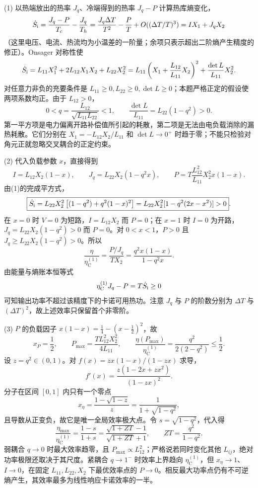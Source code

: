 (1) 以热端放出的热率 \(J_q\)、冷端得到的热率 \(J_q-P\) 计算热库熵变化，
\[
\dot S_{\rm i}=\frac{J_q-P}{T_c}-\frac{J_q}{T_h}
=\frac{J_q\Delta T}{T^2}-\frac{P}{T}+O((\Delta T/T)^3)
=I X_1+J_qX_2
\]
（这里电压、电流、热流均为小温差的一阶量；余项只表示超出二阶熵产生精度的修正）。Onsager 对称性使
\[
\dot S_{\rm i}=L_{11}X_1^2+2L_{12}X_1X_2+L_{22}X_2^2
=L_{11}\left(X_1+\frac{L_{12}}{L_{11}}X_2\right)^2+
\frac{\det L}{L_{11}}X_2^2 .
\]
对任意力非负的充要条件是 \(L_{11}\ge0,L_{22}\ge0,\det L\ge0\)；本题严格正定的假设使两项系数均正。由于 \(L_{12}>0\)，
\[
\boxed{0<q=\frac{L_{12}}{\sqrt{L_{11}L_{22}}}<1},\qquad
\frac{\det L}{L_{11}}=L_{22}(1-q^2)>0.
\]
第一平方项是电力偏离开路补偿值所引起的耗散，第二项是无法由电负载消除的漏热耗散。它们分别在 \(X_1=-L_{12}X_2/L_{11}\) 和 \(\det L\to0^+\) 时趋于零；不能只检验对角元正就忽略交叉耦合的正定约束。

(2) 代入负载参数 \(x\)，直接得到
\[
\boxed{I=L_{12}X_2(1-x)},\qquad
\boxed{J_q=L_{22}X_2(1-q^2x)},\qquad
\boxed{P=T\frac{L_{12}^2}{L_{11}}X_2^2x(1-x)} .
\]
由(1)的完成平方式，
\[
\boxed{\dot S_{\rm i}=L_{22}X_2^2\left[(1-q^2)+q^2(1-x)^2\right]
=L_{22}X_2^2[1-q^2(2x-x^2)]>0}.
\]
在 \(x=0\) 时 \(V=0\) 为短路，\(I=L_{12}X_2\) 而 \(P=0\)；在 \(x=1\) 时 \(I=0\) 为开路，\(J_q=L_{22}X_2(1-q^2)>0\) 而 \(P=0\)。对 \(0<x<1\)，\(P>0\) 且 \(J_q\ge L_{22}X_2(1-q^2)>0\)。所以
\[
\boxed{\frac{\eta}{\eta_{\mathrm C}^{(1)}}
=\frac{P/J_q}{TX_2}=\frac{q^2x(1-x)}{1-q^2x}}.
\]
由能量与熵账本恒等式
\[
\eta_{\mathrm C}^{(1)}J_q-P=T\dot S_{\rm i}\ge0
\]
可知输出功率不超过该精度下的卡诺可用热功。注意 \(J_q\) 与 \(P\) 的阶数分别为 \(\Delta T\) 与 \((\Delta T)^2\)，故上述效率只保留首个非零阶。

(3) \(P\) 的负载因子 \(x(1-x)=\tfrac14-(x-\tfrac12)^2\)，故
\[
\boxed{x_P=\frac12},\qquad
\boxed{P_{\max}=\frac{TL_{12}^2X_2^2}{4L_{11}}},\qquad
\boxed{\frac{\eta(P_{\max})}{\eta_{\mathrm C}^{(1)}}=
\frac{q^2}{2(2-q^2)}\le\frac12}.
\]
设 \(z=q^2\in(0,1)\)。对 \(f(x)=zx(1-x)/(1-zx)\) 求导，
\[
f'(x)=\frac{z(1-2x+zx^2)}{(1-zx)^2}.
\]
分子在区间 \([0,1]\) 内只有一个零点
\[
\boxed{x_\eta=\frac{1-\sqrt{1-z}}{z}
=\frac1{1+\sqrt{1-q^2}}},
\]
且导数从正变负，故它是唯一全局效率极大点。令 \(s=\sqrt{1-q^2}\)，代入得
\[
\boxed{\frac{\eta_{\max}}{\eta_{\mathrm C}^{(1)}}=
\frac{1-s}{1+s}
=\frac{\sqrt{1+ZT}-1}{\sqrt{1+ZT}+1}},\qquad
ZT=\frac{q^2}{1-q^2}.
\]
弱耦合 \(q\to0\) 时最大效率趋零，且 \(P_{\max}\propto L_{12}^2\)；严格说若同时变化其他 \(L_{ij}\)，绝对功率极限还取决于其尺度。紧耦合 \(q\to1^-\) 时效率上界趋向 \(\eta_{\mathrm C}^{(1)}\)，但 \(x_\eta\to1\)、\(I\to0\)，在固定 \(L_{11},L_{22},X_2\) 下最优效率点的 \(P\to0\)。相反最大功率点仍有不可逆熵产生，其效率最多为线性响应卡诺效率的一半。


